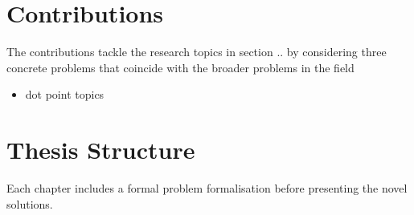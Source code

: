 % 
%                                                
%                                                
%                                                
% 

\section{Contributions}\label{sec:intro:contributions}

The contributions tackle the research topics in section .. by considering three concrete problems that coincide with the broader problems in the field

\begin{itemize}
    \item dot point topics
\end{itemize}



% 
%                                                                    
%                                                                    
%                                                                    
% 

\section{Thesis Structure}\label{sec:intro:structure}

Each chapter includes a formal problem formalisation before presenting the novel solutions.